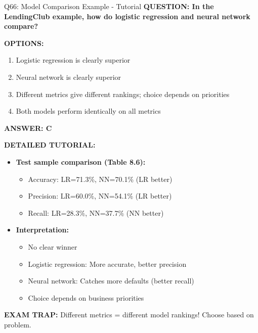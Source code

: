 \documentclass[8pt]{beamer}
\begin{document}
	\begin{frame}{Q66: Model Comparison Example - Tutorial}
		\fontsize{6.5}{7.5}\selectfont
		\textbf{QUESTION: In the LendingClub example, how do logistic regression and neural network compare?}
		
		\vspace{0.1cm}
		\textbf{OPTIONS:}
		\begin{enumerate}
			\item Logistic regression is clearly superior
			\item Neural network is clearly superior
			\item Different metrics give different rankings; choice depends on priorities
			\item Both models perform identically on all metrics
		\end{enumerate}
		
		\vspace{0.1cm}
		\textcolor{myblue}{\textbf{ANSWER: C}}
		
		\vspace{0.1cm}
		\textbf{DETAILED TUTORIAL:}
		\begin{itemize}
			\item \textbf{Test sample comparison (Table 8.6):}
			\begin{itemize}
				\item Accuracy: LR=71.3\%, NN=70.1\% (LR better)
				\item Precision: LR=60.0\%, NN=54.1\% (LR better)
				\item Recall: LR=28.3\%, NN=37.7\% (NN better)
			\end{itemize}
			\item \textbf{Interpretation:}
			\begin{itemize}
				\item No clear winner
				\item Logistic regression: More accurate, better precision
				\item Neural network: Catches more defaults (better recall)
				\item Choice depends on business priorities
			\end{itemize}
		\end{itemize}
		
		\textcolor{myred}{\textbf{EXAM TRAP:}} Different metrics = \textcolor{myblue}{different model rankings}! Choose based on problem.
	\end{frame}
	
\end{document}
